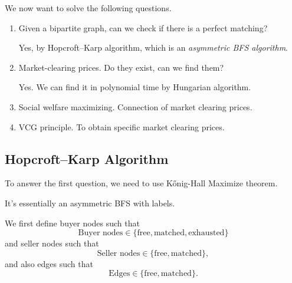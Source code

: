 \begin{problem}
We now want to solve the following questions.
\begin{enumerate}
	\item Given a bipartite graph, can we check if there is a perfect matching?
	      \begin{answer}
		      Yes, by Hopcroft–Karp algorithm, which is an \emph{asymmetric BFS algorithm}.
	      \end{answer}
	\item Market-clearing prices. Do they exist, can we find them?
	      \begin{answer}
		      Yes. We can find it in polynomial time by Hungarian algorithm.
	      \end{answer}
	\item Social welfare maximizing. Connection of market clearing prices.
	\item VCG principle. To obtain specific market clearing prices.
\end{enumerate}
\end{problem}

\subsection{Hopcroft–Karp Algorithm}
\label{Hopcroft-Karp Algorithm}
To answer the first question, we need to use Kőnig-Hall Maximize theorem.
\begin{intuition}
	It's essentially an asymmetric BFS with labels.
\end{intuition}

We first define buyer nodes such that
\[
	\text{Buyer nodes}\in \{\text{free}, \text{matched}, \text{exhausted}   \}
\]
and seller nodes such that
\[
	\text{Seller nodes}\in \{\text{free}, \text{matched}\},
\]
and also edges such that
\[
	\text{Edges}\in \{\text{free}, \text{matched}\}.
\]

